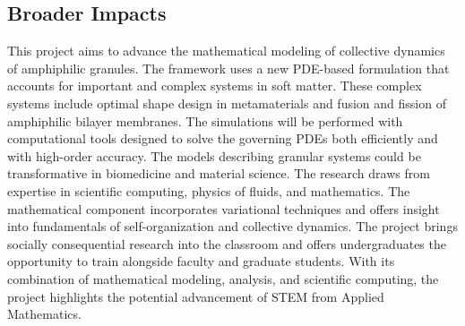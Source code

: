 \documentclass[11pt]{article}
\begin{document}
\subsection*{Broader Impacts}
\vspace{-0.1in}
This project aims to advance the mathematical modeling of collective
dynamics of amphiphilic granules. The framework uses a new PDE-based
formulation that accounts for important and complex systems in soft
matter. These complex systems include optimal shape design in
metamaterials and fusion and fission of amphiphilic bilayer membranes.
The simulations will be performed with computational tools designed to
solve the governing PDEs both efficiently and with high-order accuracy.
The models describing granular systems could be transformative in
biomedicine and material science. The research draws from expertise in
scientific computing, physics of fluids, and mathematics. The
mathematical component incorporates variational techniques and offers
insight into fundamentals of self-organization and collective dynamics.
The project brings socially consequential research into the classroom
and offers undergraduates the opportunity to train alongside faculty and
graduate students. With its combination of mathematical modeling,
analysis, and scientific computing, the project highlights the potential
advancement of STEM from Applied Mathematics.
\end{document}
